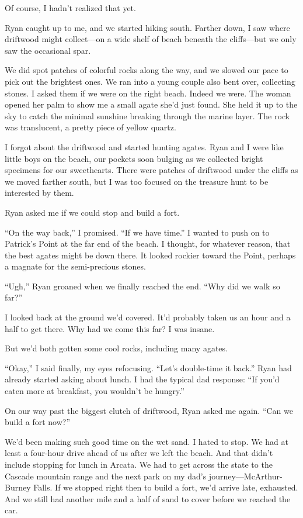 \documentclass[12pt]{book}
\begin{document}
Of course, I hadn't realized that yet.

Ryan caught up to me, and we started hiking south. Farther down, I saw where driftwood might collect---on a wide shelf of beach beneath the cliffs---but we only saw the occasional spar.

We did spot patches of colorful rocks along the way, and we slowed our pace to pick out the brightest ones. We ran into a young couple also bent over, collecting stones. I asked them if we were on the right beach. Indeed we were. The woman opened her palm to show me a small agate she'd just found. She held it up to the sky to catch the minimal sunshine breaking through the marine layer. The rock was translucent, a pretty piece of yellow quartz.

I forgot about the driftwood and started hunting agates. Ryan and I were like little boys on the beach, our pockets soon bulging as we collected bright specimens for our sweethearts. There were patches of driftwood under the cliffs as we moved farther south, but I was too focused on the treasure hunt to be interested by them.

Ryan asked me if we could stop and build a fort.

``On the way back,'' I promised. ``If we have time.'' I wanted to push on to Patrick's Point at the far end of the beach. I thought, for whatever reason, that the best agates might be down there. It looked rockier toward the Point, perhaps a magnate for the semi-precious stones.

``Ugh,'' Ryan groaned when we finally reached the end. ``Why did we walk so far?''

I looked back at the ground we'd covered. It'd probably taken us an hour and a half to get there. Why had we come this far? I was insane.

But we'd both gotten some cool rocks, including many agates.

``Okay,'' I said finally, my eyes refocusing. ``Let's double-time it back.'' Ryan had already started asking about lunch. I had the typical dad response: ``If you'd eaten more at breakfast, you wouldn't be hungry.''

On our way past the biggest clutch of driftwood, Ryan asked me again. ``Can we build a fort now?''

We'd been making such good time on the wet sand. I hated to stop. We had at least a four-hour drive ahead of us after we left the beach. And that didn't include stopping for lunch in Arcata. We had to get across the state to the Cascade mountain range and the next park on my dad's journey---McArthur-Burney Falls. If we stopped right then to build a fort, we'd arrive late, exhausted. And we still had another mile and a half of sand to cover before we reached the car.
\end{document}

